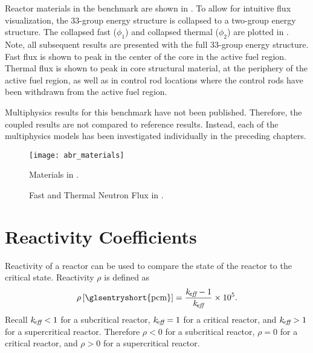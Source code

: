   Reactor materials in the benchmark are shown in .
  To allow for intuitive flux visualization, the 33-group energy structure is
  collapsed to a two-group energy structure. The collapsed fast ($\phi_1$) and
  collapsed thermal ($\phi_2$) are plotted in .  Note, all
  subsequent results are presented with the full 33-group energy structure. Fast
  flux is shown to peak in the center of the core in the active fuel region.
  Thermal flux is shown to peak in core structural material, at the periphery of
  the active fuel region, as well as in control rod locations where the control
  rods have been withdrawn from the active fuel region.

  Multiphysics results for this benchmark have not been published. Therefore,
  the coupled results are not compared to reference results. Instead, each of
  the multiphysics models has been investigated individually in the preceding
  chapters. 

  \begin{figure}
    \centering
    \texttt{[image: abr\_materials]}
    \caption{Materials in .}
    \label{fig:abr_materials}
  \end{figure}

  \begin{figure}
    \centering
    \hspace{0.2in}
    \caption{Fast and Thermal Neutron Flux in .}
    \label{fig:abr_fluxes}
  \end{figure}

\section{Reactivity Coefficients}
\label{sec:reactivity_coefficients}
  Reactivity of a reactor can be used to compare the state of the reactor to the
  critical state. Reactivity $\rho$ is defined as
  \begin{equation}
    \label{eq:reactivity}
    \rho \units{\glsentryshort{pcm}} = \frac{\keff-1}{\keff} \times 10^5.
  \end{equation}
  Recall $k_{\!\mbox{\scriptsize \em eff}} < 1$ for a subcritical reactor, $k_{\!\mbox{\scriptsize \em eff}}=1$ for a critical
  reactor, and $k_{\!\mbox{\scriptsize \em eff}} > 1$ for a supercritical reactor. Therefore $\rho < 0$
  for a subcritical reactor, $\rho = 0$ for a critical reactor, and $\rho > 0$
  for a supercritical reactor. 

